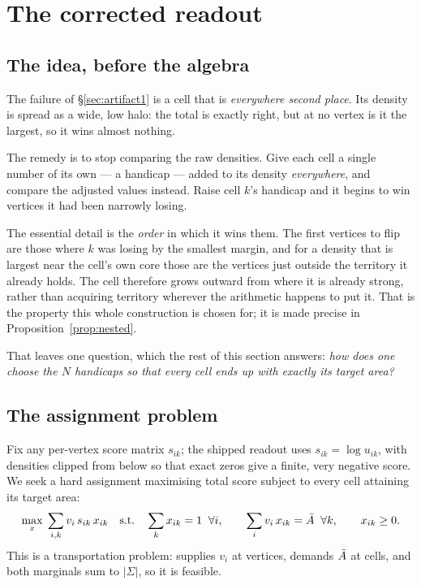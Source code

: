 \documentclass[11pt,a4paper]{article}
\begin{document}
\section{The corrected readout}
\label{sec:correction}

\subsection{The idea, before the algebra}

\begin{tcolorbox}[colback=olive!4!white, colframe=olive!55!black,
                  title={Intuition: one handicap per cell}, fontupper=\small]
The failure of \S\ref{sec:artifact1} is a cell that is \emph{everywhere second
place}. Its density is spread as a wide, low halo: the total is exactly right, but
at no vertex is it the largest, so it wins almost nothing.

The remedy is to stop comparing the raw densities. Give each cell a single number
of its own --- a handicap --- added to its density \emph{everywhere}, and compare
the adjusted values instead. Raise cell $k$'s handicap and it begins to win
vertices it had been narrowly losing.

The essential detail is the \emph{order} in which it wins them. The first vertices
to flip are those where $k$ was losing by the smallest margin, and for a density
that is largest near the cell's own core those are the vertices just outside the
territory it already holds. The cell therefore grows outward from where it is
already strong, rather than acquiring territory wherever the arithmetic happens to
put it. That is the property this whole construction is chosen for; it is made
precise in Proposition~\ref{prop:nested}.

That leaves one question, which the rest of this section answers: \emph{how does
one choose the $N$ handicaps so that every cell ends up with exactly its target
area?}
\end{tcolorbox}

\subsection{The assignment problem}

Fix any per-vertex score matrix $s_{ik}$; the shipped readout uses
$s_{ik} = \log u_{ik}$, with densities clipped from below so that exact zeros give
a finite, very negative score. We seek a hard assignment maximising total score
subject to every cell attaining its target area:
\begin{equation}
  \max_{x} \; \sum_{i,k} v_i\, s_{ik}\, x_{ik}
  \quad\text{s.t.}\quad
  \sum_k x_{ik} = 1 \;\; \forall i, \qquad
  \sum_i v_i\, x_{ik} = \bar{A} \;\; \forall k, \qquad
  x_{ik} \ge 0 .
  \label{eq:lp}
\end{equation}
This is a transportation problem: supplies $v_i$ at vertices, demands $\bar{A}$ at
cells, and both marginals sum to $|\Sigma|$, so it is feasible.
\end{document}
